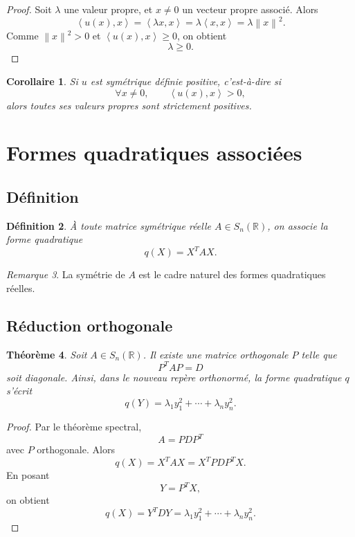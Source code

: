 \documentclass[11pt,a4paper]{article}
\newtheorem{definition}{Définition}[section]
\newtheorem{theoreme}[definition]{Théorème}
\newtheorem{corollaire}[definition]{Corollaire}
\theoremstyle{remark}
\newtheorem{remarque}[definition]{Remarque}
\newcommand{\R}{\mathbb{R}}
\newcommand{\Norm}[1]{\left\|#1\right\|}
\newcommand{\scal}[2]{\left\langle #1,#2\right\rangle}
\begin{document}
\begin{proof}
Soit \(\lambda\) une valeur propre, et \(x\neq 0\) un vecteur propre associé. Alors
\[
\scal{u(x)}{x}=\scal{\lambda x}{x}=\lambda \scal{x}{x}=\lambda \Norm{x}^2.
\]
Comme \(\Norm{x}^2>0\) et \(\scal{u(x)}{x}\ge 0\), on obtient
\[
\lambda\ge 0.
\]
\end{proof}

\begin{corollaire}
Si \(u\) est symétrique définie positive, c’est-à-dire si
\[
\forall x\neq 0,\qquad \scal{u(x)}{x}>0,
\]
alors toutes ses valeurs propres sont strictement positives.
\end{corollaire}

\section{Formes quadratiques associées}

\subsection{Définition}

\begin{definition}
À toute matrice symétrique réelle \(A\in S_n(\R)\), on associe la forme quadratique
\[
q(X)=X^TAX.
\]
\end{definition}

\begin{remarque}
La symétrie de \(A\) est le cadre naturel des formes quadratiques réelles.
\end{remarque}

\subsection{Réduction orthogonale}

\begin{theoreme}
Soit \(A\in S_n(\R)\). Il existe une matrice orthogonale \(P\) telle que
\[
P^TAP=D
\]
soit diagonale. Ainsi, dans le nouveau repère orthonormé, la forme quadratique \(q\) s’écrit
\[
q(Y)=\lambda_1 y_1^2+\cdots+\lambda_n y_n^2.
\]
\end{theoreme}

\begin{proof}
Par le théorème spectral,
\[
A=PDP^T
\]
avec \(P\) orthogonale. Alors
\[
q(X)=X^TAX=X^T P D P^T X.
\]
En posant
\[
Y=P^TX,
\]
on obtient
\[
q(X)=Y^TDY=\lambda_1 y_1^2+\cdots+\lambda_n y_n^2.
\]
\end{proof}
\end{document}

